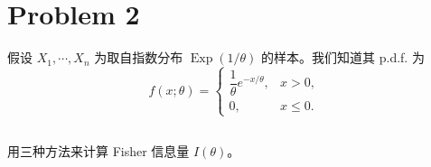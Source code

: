 \documentclass[12pt,a4paper]{article}
\begin{document}
\section{Problem 2}

假设 $X_1,\cdots,X_n$ 为取自指数分布 $\operatorname{Exp}(1/\theta)$ 的样本。我们知道其 p.d.f. 为
\[
  f(x;\theta)=
  \begin{cases}
    \dfrac{1}{\theta}e^{-x/\theta}, & x>0,\\[0.4em]
    0, & x\le 0.
  \end{cases}
\]

\subsection{}

用三种方法来计算 Fisher 信息量 $I(\theta)$。
\end{document}
